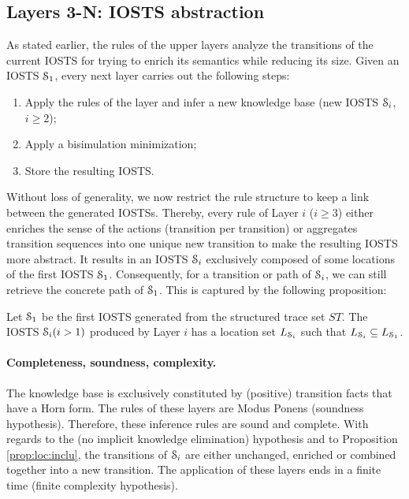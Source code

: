 
\subsection{Layers 3-N: IOSTS abstraction}
\label{sec:modelinf:webapps:L4}

As stated earlier, the rules of the upper layers analyze the
transitions of the current IOSTS for trying to enrich its
semantics while reducing its size. Given an IOSTS
$\EuScript{S}_1$, every next layer carries out the following
steps:

\begin{enumerate}
\item Apply the rules of the layer and infer a new knowledge base
(new IOSTS $\EuScript{S}_i$, $i\geq 2$);

\item Apply a bisimulation minimization;

\item Store the resulting IOSTS.
\end{enumerate}

Without loss of generality, we now restrict the rule structure to
keep a link between the generated IOSTSs. Thereby, every rule of
Layer $i$ ($i \geq 3$) either enriches the sense of the actions
(transition per transition) or aggregates transition sequences
into one unique new transition to make the resulting IOSTS more
abstract. It results in an IOSTS $\EuScript{S}_i$ exclusively
composed of some locations of the first IOSTS $\EuScript{S}_1$.
Consequently, for a transition or path of $\EuScript{S}_i$, we
can still retrieve the concrete path of $\EuScript{S}_1$. This is
captured by the following proposition:

\begin{proposition}
\label{prop:loc:inclu}
Let $\EuScript{S}_1$ be the first IOSTS generated from the
structured trace set $ST$. The IOSTS $\EuScript{S}_i (i>1)$
produced by Layer $i$ has a location set $L_{\EuScript{S}_i}$
such that $L_{\EuScript{S}_i} \subseteq L_{\EuScript{S}_1}$.
\end{proposition}

\paragraph{Completeness, soundness, complexity.}

The knowledge base is exclusively constituted by (positive)
transition facts that have a Horn form. The rules of these layers
are Modus Ponens (soundness hypothesis). Therefore, these
inference rules are sound and complete. With regards to the (no
implicit knowledge elimination) hypothesis and to Proposition
\ref{prop:loc:inclu}, the transitions of $\EuScript{S}_i$ are
either unchanged, enriched or combined together into a new
transition. The application of these layers ends in a finite time
(finite complexity hypothesis).


